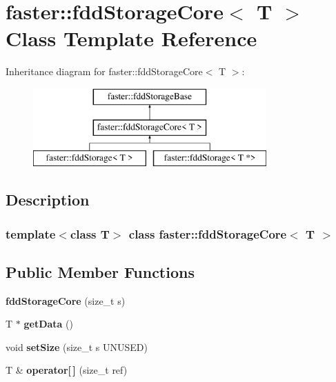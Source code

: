 \hypertarget{classfaster_1_1fddStorageCore}{}\section{faster\+:\+:fdd\+Storage\+Core$<$ T $>$ Class Template Reference}
\label{classfaster_1_1fddStorageCore}
Inheritance diagram for faster\+:\+:fdd\+Storage\+Core$<$ T $>$\+:\begin{figure}[H]
\begin{center}
\leavevmode
\includegraphics[height=3.000000cm]{classfaster_1_1fddStorageCore}
\end{center}
\end{figure}


\subsection{Description}
\subsubsection*{template$<$class T$>$\newline
class faster\+::fdd\+Storage\+Core$<$ T $>$}

\subsection*{Public Member Functions}
\begin{DoxyCompactItemize}
\item 
\hypertarget{classfaster_1_1fddStorageCore_aaae0b252366d73dec3995251fdc75920}{}\label{classfaster_1_1fddStorageCore_aaae0b252366d73dec3995251fdc75920} 
{\bfseries fdd\+Storage\+Core} (size\+\_\+t s)
\item 
\hypertarget{classfaster_1_1fddStorageCore_aa3d19bc27af39d838226ab3e196beb15}{}\label{classfaster_1_1fddStorageCore_aa3d19bc27af39d838226ab3e196beb15} 
T $\ast$ {\bfseries get\+Data} ()
\item 
\hypertarget{classfaster_1_1fddStorageCore_a6bf9e9e16bdcaf4164ac5a3d28848ec0}{}\label{classfaster_1_1fddStorageCore_a6bf9e9e16bdcaf4164ac5a3d28848ec0} 
void {\bfseries set\+Size} (size\+\_\+t s U\+N\+U\+S\+ED)
\item 
\hypertarget{classfaster_1_1fddStorageCore_ad4608901a31ab093edc8be2a3852a014}{}\label{classfaster_1_1fddStorageCore_ad4608901a31ab093edc8be2a3852a014} 
T \& {\bfseries operator\mbox{[}$\,$\mbox{]}} (size\+\_\+t ref)
\end{DoxyCompactItemize}

